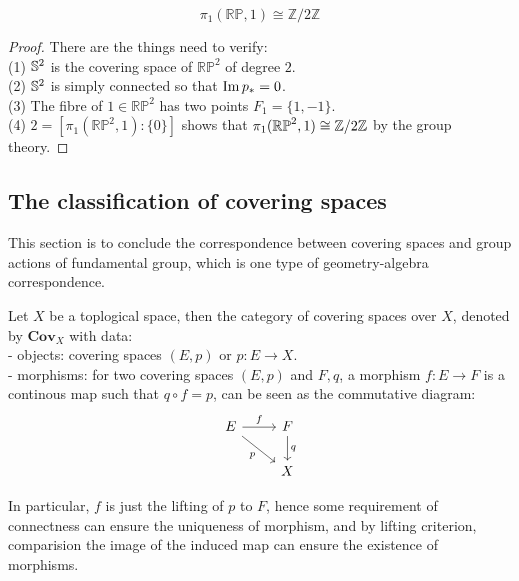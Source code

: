 \documentclass[12pt,a4paper]{article}
\begin{document}
\begin{corollary}
    \[\pi_1(\mathbb{RP},1) \cong \mathbb{Z}/2\mathbb{Z}\]
\end{corollary}
\begin{proof}
    There are the things need to verify:\\
    (1) \(\mathbb{S}^2\) is the covering space of \(\mathbb{RP}^2\) of degree \(2\).\\
    (2) \(\mathbb{S}^2\) is simply connected so that \(\operatorname{Im} p_* = 0\).\\
    (3) The fibre of \(1 \in \mathbb{RP}^2\) has two points \(F_1 = \{1,-1\}\).\\
    (4) \(2 = [\pi_1(\mathbb{RP}^2,1): \{0\}]\) shows that \(\pi_1(\mathbb{RP}^2,1) \cong \mathbb{Z}/2\mathbb{Z}\) by the group theory.

\end{proof}

\subsection{The classification of covering spaces}

This section is to conclude the correspondence between covering spaces and group actions of fundamental group, which is one type of geometry-algebra correspondence.

\begin{definitionplain} 
    Let \(X\) be a toplogical space, then the category of covering spaces over \(X\), denoted by \(\mathbf{Cov}_X\)
    with data:\\

    - objects: covering spaces \((E,p)\) or \(p:E \to X\).\\

    - morphisms: for two covering spaces \((E,p)\) and \(F,q\), a morphism \(f:E \to F\) is a continous map such that \(q \circ f = p\), can be seen as the commutative diagram:
\[\begin{tikzcd}
	E & F \\
	& X
	\arrow["f", from=1-1, to=1-2]
	\arrow["p"', from=1-1, to=2-2]
	\arrow["q", from=1-2, to=2-2]
\end{tikzcd}\]
\end{definitionplain}

In particular, \(f\) is just the lifting of \(p\) to \(F\), hence some requirement of connectness can ensure the uniqueness of morphism, and by lifting criterion, comparision the image of the induced map can ensure the existence of morphisms.
\end{document}

